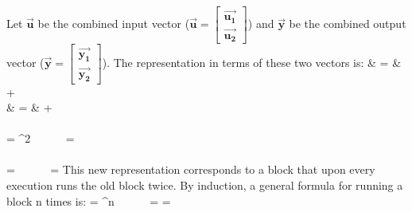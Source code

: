 Let $\vec{\mathbf{u}}$ be the combined input vector ($\vec{\mathbf{u}}
= \left [ \begin{array} {c} \vec{\mathbf{u_1}}
\\ \vec{\mathbf{u_2}} \end{array} \right ]$) and $\vec{\mathbf{y}}$ be the combined output vector
($\vec{\mathbf{y}} = \left [ \begin{array} {c} \vec{\mathbf{y_1}}
\\ \vec{\mathbf{y_2}} \end{array} \right ]$). The representation in terms of these two
vectors is:
\starteqnstar
{} & = &  +  \\
 & = &  + 
\doneeqnstar ~ \\ \vspace{-36pt} ~ \\
\starteqnstar
{} = ^2 ~~~~~
 =   \\ ~ \\
 =  ~~~~~
 = 
\doneeqnstar
This new representation corresponds to a block that upon every
execution runs the old block twice. By induction, a general formula
for running a block n times is:
\starteqnstar
{} = ^n ~~~~~
 = 
\doneeqnstar
\starteqnstar
{} = ~~~~~~~~~~~~~~~~~~~~~~~~~~~~~~~~~~~~~~~ \\
